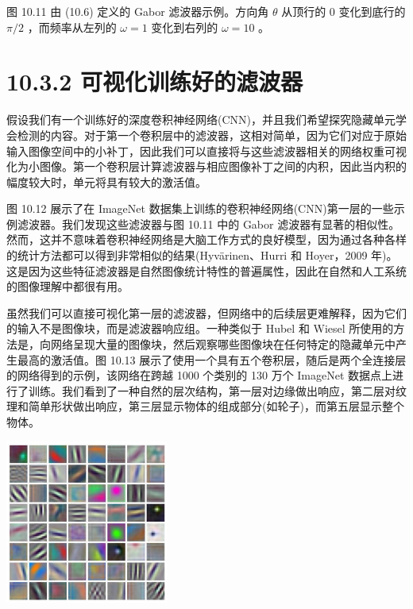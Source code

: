 \documentclass[10pt]{article}
\begin{document}
图 10.11 由 (10.6) 定义的 Gabor 滤波器示例。方向角 \(\theta\) 从顶行的 0 变化到底行的 \(\pi /2\) ，而频率从左列的 \(\omega  = 1\) 变化到右列的 \(\omega  = {10}\) 。

\section*{10.3.2 可视化训练好的滤波器}

假设我们有一个训练好的深度卷积神经网络(CNN)，并且我们希望探究隐藏单元学会检测的内容。对于第一个卷积层中的滤波器，这相对简单，因为它们对应于原始输入图像空间中的小补丁，因此我们可以直接将与这些滤波器相关的网络权重可视化为小图像。第一个卷积层计算滤波器与相应图像补丁之间的内积，因此当内积的幅度较大时，单元将具有较大的激活值。

图 10.12 展示了在 ImageNet 数据集上训练的卷积神经网络(CNN)第一层的一些示例滤波器。我们发现这些滤波器与图 10.11 中的 Gabor 滤波器有显著的相似性。然而，这并不意味着卷积神经网络是大脑工作方式的良好模型，因为通过各种各样的统计方法都可以得到非常相似的结果(Hyvärinen、Hurri 和 Hoyer，2009 年)。这是因为这些特征滤波器是自然图像统计特性的普遍属性，因此在自然和人工系统的图像理解中都很有用。

虽然我们可以直接可视化第一层的滤波器，但网络中的后续层更难解释，因为它们的输入不是图像块，而是滤波器响应组。一种类似于 Hubel 和 Wiesel 所使用的方法是，向网络呈现大量的图像块，然后观察哪些图像块在任何特定的隐藏单元中产生最高的激活值。图 10.13 展示了使用一个具有五个卷积层，随后是两个全连接层的网络得到的示例，该网络在跨越 1000 个类别的 130 万个 ImageNet 数据点上进行了训练。我们看到了一种自然的层次结构，第一层对边缘做出响应，第二层对纹理和简单形状做出响应，第三层显示物体的组成部分(如轮子)，而第五层显示整个物体。

\begin{center}
\includegraphics[max width=0.4\textwidth]{images/0194e279-9b28-703a-88f4-c3ac21e2010d_323_917_376_599_603_0.jpg}
\end{center}
\hspace*{3em} 
\end{document}
